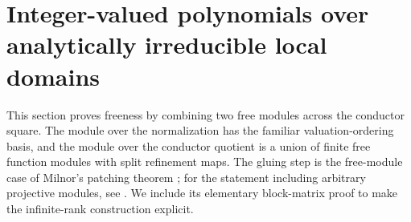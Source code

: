 \documentclass[11pt,a4paper]{article}
\theoremstyle{definition}
\begin{document}
\section{Integer-valued polynomials over analytically irreducible local domains}
\label{sec:integer-free}
This section proves freeness by combining two free modules across the
conductor square. The module over the normalization has the familiar
valuation-ordering basis, and the module over the conductor quotient
is a union of finite free function modules with split refinement maps.
The gluing step is the free-module case of Milnor's patching theorem
\cite[\S2, Theorems~2.1--2.3]{Milnor1971KTheory}; for the statement
including arbitrary projective modules, see
\cite[Theorem~2.3, p.~4]{ChenLe2020Milnor}. We include its elementary
block-matrix proof to make the infinite-rank construction explicit.
\end{document}
